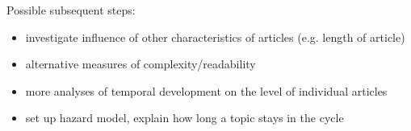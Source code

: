 \documentclass[12pt]{article}\usepackage[]{graphicx}\usepackage[]{color}
\begin{document}
Possible subsequent steps:
\begin{itemize}
  \item investigate influence of other characteristics of articles (e.g. length of article)
  \item alternative measures of complexity/readability
  \item more analyses of temporal development on the level of individual articles
  \item set up hazard model, explain how long a topic stays in the cycle
\end{itemize}




\end{document}
